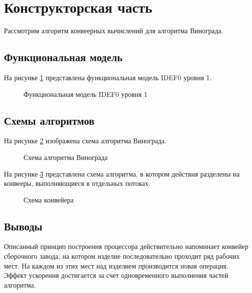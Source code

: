 \newpage
\section{Конструкторская часть}

Рассмотрим алгоритм конвеерных вычислений для алгоритма Винограда.

\subsection{Функциональная модель}

На рисунке \ref{img:idef0} представлена функциональная модель IDEF0 уровня 1.

\begin{figure}[H]
    \caption{Функциональная модель IDEF0 уровня 1}
    \label{img:idef0}
\end{figure}

\subsection{Схемы алгоритмов}

На рисунке \ref{img:modvinograd} изображена схема
алгоритма Винограда.

\begin{figure}[H]
    \caption{Схема алгоритма Винограда}
    \label{img:modvinograd}
\end{figure}

На рисунке \ref{img:conveer} представлена схема алгоритма, в котором действия
разделены на конвееры, выполняющиеся в отдельных потоках.

\begin{figure}[H]
    \caption{Схема конвейера}
    \label{img:conveer}
\end{figure}

\subsection{Выводы}

Описанный принцип построения процессора действительно напоминает конвейер сборочного завода, на котором изделие последовательно проходит ряд рабочих мест. На каждом из этих мест над изделием производится новая операция. Эффект ускорения достигается за счет одновременного выполнения частей алгоритма.
